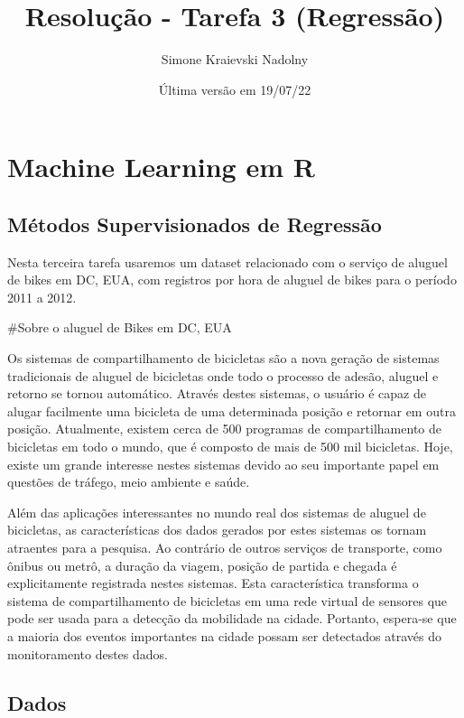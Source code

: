 \documentclass[
]{article}
\title{Resolução - Tarefa 3 (Regressão)}
\author{Simone Kraievski Nadolny}
\date{Última versão em 19/07/22}
\begin{document}
\maketitle

{
\setcounter{tocdepth}{2}
\tableofcontents
}
\hypertarget{machine-learning-em-r}{%
\section{Machine Learning em R}\label{machine-learning-em-r}}

\hypertarget{muxe9todos-supervisionados-de-regressuxe3o}{%
\subsection{Métodos Supervisionados de
Regressão}\label{muxe9todos-supervisionados-de-regressuxe3o}}

Nesta terceira tarefa usaremos um dataset relacionado com o serviço de
aluguel de bikes em DC, EUA, com registros por hora de aluguel de bikes
para o período 2011 a 2012.

\#Sobre o aluguel de Bikes em DC, EUA

Os sistemas de compartilhamento de bicicletas são a nova geração de
sistemas tradicionais de aluguel de bicicletas onde todo o processo de
adesão, aluguel e retorno se tornou automático. Através destes sistemas,
o usuário é capaz de alugar facilmente uma bicicleta de uma determinada
posição e retornar em outra posição. Atualmente, existem cerca de 500
programas de compartilhamento de bicicletas em todo o mundo, que é
composto de mais de 500 mil bicicletas. Hoje, existe um grande interesse
nestes sistemas devido ao seu importante papel em questões de tráfego,
meio ambiente e saúde.

Além das aplicações interessantes no mundo real dos sistemas de aluguel
de bicicletas, as características dos dados gerados por estes sistemas
os tornam atraentes para a pesquisa. Ao contrário de outros serviços de
transporte, como ônibus ou metrô, a duração da viagem, posição de
partida e chegada é explicitamente registrada nestes sistemas. Esta
característica transforma o sistema de compartilhamento de bicicletas em
uma rede virtual de sensores que pode ser usada para a detecção da
mobilidade na cidade. Portanto, espera-se que a maioria dos eventos
importantes na cidade possam ser detectados através do monitoramento
destes dados.

\hypertarget{dados}{%
\subsection{Dados}\label{dados}}
\end{document}
